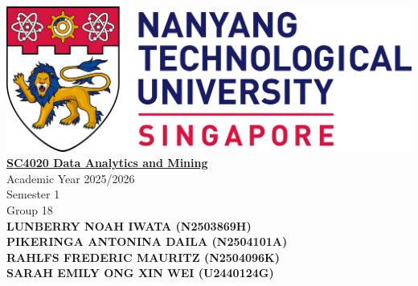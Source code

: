 \documentclass[12pt]{article}
\begin{document}
\begin{center}
    \includegraphics[width=\linewidth]{NTU_Logo.png}
    \\[1cm]
    \underline{\textbf{SC4020 Data Analytics and Mining}}
    \\[1.5em]
    Academic Year 2025/2026
    \\[1em]
    Semester 1
    \\[2em]
    Group 18
    \\[5em]
    \textbf{
        LUNBERRY NOAH IWATA (N2503869H) \\[1em]
        PIKERINGA ANTONINA DAILA (N2504101A) \\[1em]
        RAHLFS FREDERIC MAURITZ (N2504096K) \\[1em]
        SARAH EMILY ONG XIN WEI (U2440124G) \\[1em]
        }
\end{center}
\pagebreak

\justifying

\pagestyle{fancy}
\fancyhf{}  %
\fancyhead[R]{\textcolor{gray}{\nouppercase{\leftmark}}}   %
\fancyfoot[C]{\thepage}  %


\pagebreak
\renewcommand{\cftdotsep}{0.5}
\renewcommand{\cftsecleader}{\cftdotfill{\cftdotsep}}
\renewcommand{\contentsname}{Table of Contents}  %
\setlength{\cftbeforesecskip}{10pt}   %
\setlength{\cftbeforesubsecskip}{10pt} %
\setlength{\cftbeforesubsubsecskip}{10pt} %
\renewcommand{\cftsecpresnum}{Chapter~} %
\renewcommand{\cftsecaftersnum}{\quad} 
\setlength{\cftsecnumwidth}{6.1em}   %
\end{document}
